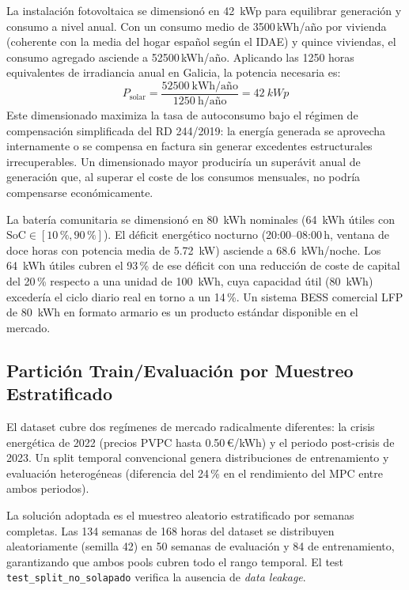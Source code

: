 \documentclass[12pt, a4paper, twoside]{report}
\begin{document}
La instalación fotovoltaica se dimensionó en \SI{42}{kWp} para equilibrar
generación y consumo a nivel anual. Con un consumo medio de \num{3500}\,kWh/año
por vivienda (coherente con la media del hogar español según el IDAE) y quince
viviendas, el consumo agregado asciende a \num{52500}\,kWh/año. Aplicando las
1250 horas equivalentes de irradiancia anual en Galicia, la potencia necesaria es:
\begin{equation}
  P_{\text{solar}} = \frac{\num{52500}\ \text{kWh/año}}{\num{1250}\ \text{h/año}} = \SI{42}{kWp}
  \label{eq:dimensionado}
\end{equation}
Este dimensionado maximiza la tasa de autoconsumo bajo el régimen de
compensación simplificada del RD 244/2019: la energía generada se aprovecha
internamente o se compensa en factura sin generar excedentes estructurales
irrecuperables. Un dimensionado mayor produciría un superávit anual de
generación que, al superar el coste de los consumos mensuales, no podría
compensarse económicamente.

La batería comunitaria se dimensionó en \SI{80}{kWh} nominales (\SI{64}{kWh}
útiles con $\text{SoC} \in [10\,\%, 90\,\%]$). El déficit energético nocturno
(20:00--08:00\,h, ventana de doce horas con potencia media de \SI{5,72}{kW})
asciende a \SI{68,6}{kWh/noche}. Los \SI{64}{kWh} útiles cubren el 93\,\% de ese
déficit con una reducción de coste de capital del 20\,\% respecto a una unidad
de \SI{100}{kWh}, cuya capacidad útil (\SI{80}{kWh}) excedería el ciclo diario
real en torno a un 14\,\%. Un sistema BESS comercial LFP de \SI{80}{kWh} en
formato armario es un producto estándar disponible en el mercado.

\subsection{Partición Train/Evaluación por Muestreo Estratificado}

El dataset cubre dos regímenes de mercado radicalmente diferentes: la crisis
energética de 2022 (precios PVPC hasta \num{0,50}\,€/kWh) y el periodo
post-crisis de 2023. Un split temporal convencional genera distribuciones de
entrenamiento y evaluación heterogéneas (diferencia del 24\,\% en el
rendimiento del MPC entre ambos periodos).

La solución adoptada es el muestreo aleatorio estratificado por semanas
completas. Las 134 semanas de 168 horas del dataset se distribuyen
aleatoriamente (semilla 42) en 50 semanas de evaluación y 84 de entrenamiento,
garantizando que ambos pools cubren todo el rango temporal. El test
\texttt{test\_split\_no\_solapado} verifica la ausencia de \textit{data leakage}.
\end{document}
